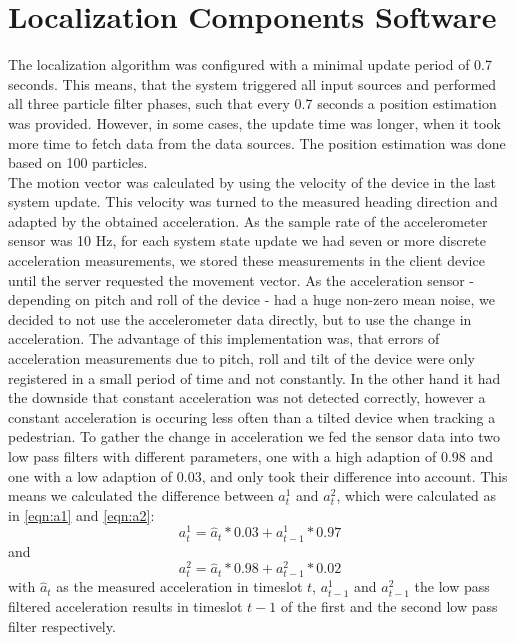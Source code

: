 \section{Localization Components Software}
The localization algorithm was configured with a minimal update period of 0.7 seconds. This means, that the system triggered all input sources and performed all three particle filter phases, such that every 0.7 seconds a position estimation was provided. However, in some cases, the update time was longer, when it took more time to fetch data from the data sources. The position estimation was done based on 100 particles.\\
\noindent\hspace*{5mm}%
The motion vector was calculated by using the velocity of the device in the last system update. This velocity was turned to the measured heading direction and adapted by the obtained acceleration.  As the sample rate of the accelerometer sensor was 10 Hz, for each system state update we had seven or more discrete acceleration measurements, we stored these measurements in the client device until the server requested the movement vector. As the acceleration sensor - depending on pitch and roll of the device - had a huge non-zero mean noise, we decided to not use the accelerometer data directly, but to use the change in acceleration. The advantage of this implementation was, that errors of acceleration measurements due to pitch, roll and tilt of the device were only registered in a small period of time and not constantly. In the other hand it had the downside that constant acceleration was not detected correctly, however a constant acceleration is occuring less often than a tilted device when tracking a pedestrian. To gather the change in acceleration we fed the sensor data into two low pass filters with different parameters, one with a high adaption of 0.98 and one with a low adaption of 0.03, and only took their difference into account. This means we calculated the difference between $a_{t}^1$ and $a_{t}^2$, which were calculated as in \ref{eqn:a1} and \ref{eqn:a2}:
\begin{equation}
a_{t}^{1} = \hat{a}_{t}*0.03 + a_{t-1}^{1} * 0.97
\label{eqn:a1}
\end{equation}
and
\begin{equation}
a_{t}^{2} = \hat{a}_{t}*0.98 + a_{t-1}^{2} * 0.02
\label{eqn:a2}
\end{equation}
with $\hat{a}_{t}$ as the measured acceleration in timeslot $t$, $a_{t-1}^{1}$ and $a_{t-1}^{2}$ the low pass filtered acceleration results in timeslot $t-1$ of the first and the second low pass filter respectively.\\
